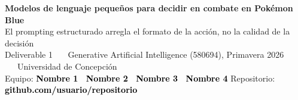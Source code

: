 \documentclass[9pt,a4paper]{extarticle}
\newcommand{\ph}[1]{\colorbox{yellow!60}{\textcolor{black}{\textbf{#1}}}}
\begin{document}
\small

\begin{tcolorbox}[colback=navy,colframe=navy,boxrule=0pt,left=3mm,right=3mm,
                  top=2mm,bottom=2mm,arc=1mm]
{\color{white}\bfseries\LARGE Modelos de lenguaje peque\~nos para decidir en combate en Pok\'emon Blue}\\[1.1mm]
{\color{white!85}\large El prompting estructurado arregla el formato de la acci\'on, no la calidad de la decisi\'on}\\[2mm]
{\color{white!75}\footnotesize
Deliverable 1 \ \textbullet\ \ Generative Artificial Intelligence (580694), Primavera 2026 \ \textbullet\ \ Universidad de Concepci\'on}\\[1.4mm]
{\footnotesize\color{white!85}Equipo:} \ph{Nombre 1 \textbullet\ Nombre 2 \textbullet\ Nombre 3 \textbullet\ Nombre 4}
\hfill
{\footnotesize\color{white!85}Repositorio:} \ph{github.com/usuario/repositorio}
\end{tcolorbox}
\end{document}
